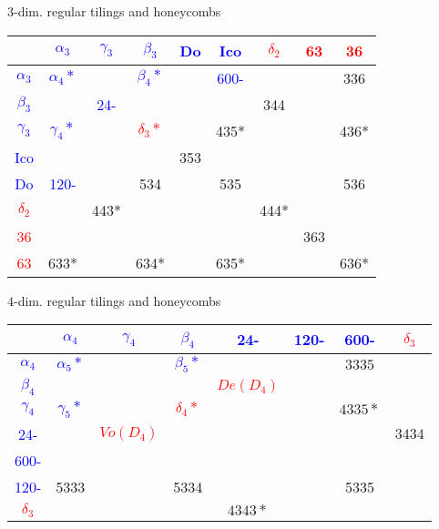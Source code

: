 \documentclass[%
pdf,
colorBG,
slideColor,
]{prosper}
\begin{document}
\begin{slide}{$3$-dim. regular tilings and honeycombs}
\begin{center}
{\scriptsize
\begin{tabular}{|c||c|c|c|c|c||c|c|c||}
\hline
&  \textcolor{blue}{$\alpha_3$} &\textcolor{blue}{$\gamma_3$} & \textcolor{blue}{$\beta_3$} & \textcolor{blue}{Do} & \textcolor{blue}{Ico}&\textcolor{red}{$\delta_2$}& \textcolor{red}{63}&\textcolor{red}{36}\\ \hline \hline
\textcolor{blue}{$\alpha_3$}&\textcolor{blue}{$\alpha_4*$}&&\textcolor{blue}{$\beta_4*$}&&\textcolor{blue}{600-}&&&336\\\hline
\textcolor{blue}{$\beta_3$}&&\textcolor{blue}{24-}&&&&344&&\\\hline
\textcolor{blue}{$\gamma_3$}  &\textcolor{blue}{$\gamma_4*$}  &&\textcolor{red}{${\delta_3*}$}  &  & 435*   & & &436* \\ \hline
\textcolor{blue}{Ico} &  && & 353 & &&   &\\ \hline
\textcolor{blue}{Do} &\textcolor{blue}{120-}    &   &534 &&535& & &  536 \\ \hline \hline
\textcolor{red}{$\delta_2$}& &443* &&& &444*  &&  \\ \hline
\textcolor{red}{36} &&& & && &363& \\ \hline
\textcolor{red}{63} &633* & &634* &&635* & &&636*  \\ \hline \hline
\end{tabular}
}
\end{center}
\end{slide}






\begin{slide}{$4$-dim. regular tilings and honeycombs}
\begin{center}
{\scriptsize
\begin{tabular}{|c||c|c|c|c|c|c||c||} 
\hline
&\textcolor{blue}{$\alpha_4$}&\textcolor{blue}{$\gamma_4$}&\textcolor{blue}{$\beta_4$}&\textcolor{blue}{24-}&\textcolor{blue}{120-}&\textcolor{blue}{600-}&\textcolor{red}{$\delta_3$}\\\hline\hline
\textcolor{blue}{$\alpha_4$}&\textcolor{blue}{$\alpha_5*$}&&\textcolor{blue}{$\beta_5*$}&&&$3335$&\\\hline
\textcolor{blue}{$\beta_4$}&&&&\textcolor{red}{$De(D_4)$}&&&\\\hline
\textcolor{blue}{$\gamma_4$}&\textcolor{blue}{$\gamma_5*$}&&\textcolor{red}{${\delta_4*}$}&&&$4335*$&\\\hline
\textcolor{blue}{24-}&&\textcolor{red}{$Vo(D_4)$}&&&&&$3434$\\\cline{3-5}\hline
\textcolor{blue}{600-}&&&&&&&\\\hline
\textcolor{blue}{120-}&5333&&5334&&&5335&\\\hline\hline
\textcolor{red}{$\delta_3$}&&&&$4343*$&&&\\\hline\hline
\end{tabular}
}
\end{center}

\end{slide}
\end{document}
